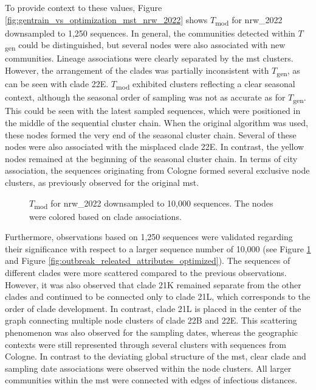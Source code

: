 To provide context to these values, Figure \ref{fig:gentrain_vs_optimization_mst_nrw_2022} shows $T$\textsubscript{mod} for nrw\_2022 downsampled to 1,250 sequences. In general, the communities detected within $T$\textsubscript{gen} could be distinguished, but several nodes were also associated with new communities. Lineage associations were clearly separated by the \acrshort{mst} clusters. However, the arrangement of the clades was partially inconsistent with $T$\textsubscript{gen}, as can be seen with clade 22E. $T$\textsubscript{mod} exhibited clusters reflecting a clear seasonal context, although the seasonal order of sampling was not as accurate as for $T$\textsubscript{gen}. This could be seen with the latest sampled sequences, which were positioned in the middle of the sequential cluster chain. When the original algorithm was used, these nodes formed the very end of the seasonal cluster chain. Several of these nodes were also associated with the misplaced clade 22E. In contrast, the yellow nodes remained at the beginning of the seasonal cluster chain. In terms of city association, the sequences originating from Cologne formed several exclusive node clusters, as previously observed for the original \acrshort{mst}.

\begin{figure}[H]
  \centering
    
    \caption[$T$\textsubscript{mod} for nrw\_2022 downsampled to 10,000 sequences]{$T$\textsubscript{mod} for nrw\_2022 downsampled to 10,000 sequences. The nodes were colored based on clade associations.}
  \label{fig:gentrain_vs_optimization_mst_nrw_2022_10000}
\end{figure}

Furthermore, observations based on 1,250 sequences were validated regarding their significance with respect to a larger sequence number of 10,000 (see Figure \ref{fig:gentrain_vs_optimization_mst_nrw_2022_10000} and Figure \ref{fig:outbreak_releated_attributes_optimized}). The sequences of different clades were more scattered compared to the previous observations. However, it was also observed that clade 21K remained separate from the other clades and continued to be connected only to clade 21L, which corresponds to the order of clade development. In contrast, clade 21L is placed in the center of the graph connecting multiple node clusters of clade 22B and 22E. This scattering phenomenon was also observed for the sampling dates, whereas the geographic contexts were still represented through several clusters with sequences from Cologne. In contrast to the deviating global structure of the \acrshort{mst}, clear clade and sampling date associations were observed within the node clusters. All larger communities within the \acrshort{mst} were connected with edges of infectious distances.

